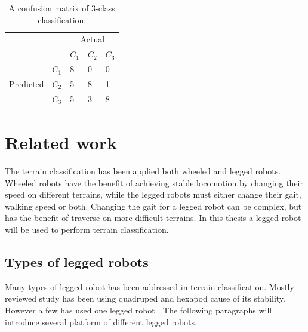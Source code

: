 \documentclass[USenglish]{ifimaster}  %
\begin{document}
	\begin{table}[h]
		\centering
		\begin{tabular}{ll|l|l|l|}
			\cline{3-5}
			&  & \multicolumn{3}{c|}{Actual} \\ \cline{3-5} 
			&  & $C_1$ & $C_2$ & $C_3$ \\ \hline
			\multicolumn{1}{|l|}{\multirow{3}{*}{Predicted}} & $C_1$ & 8 & 0 & 0 \\ \cline{2-5} 
			\multicolumn{1}{|l|}{} & $C_2$ & 5 & 8 & 1 \\ \cline{2-5} 
			\multicolumn{1}{|l|}{} & $C_3$ & 5 & 3 & 8 \\ \hline
		\end{tabular}
		\caption{A confusion matrix of 3-class classification.}
		\label{tab:cmatrix}
	\end{table}
	
	
	\section{Related work}
	The terrain classification has been applied both wheeled and legged robots. Wheeled robots have the benefit of achieving stable locomotion by changing their speed on different terrains, while the legged robots must either change their gait, walking speed or both. Changing the gait for a legged robot can be complex, but has the benefit of traverse on more difficult terrains. In this thesis a legged robot will be used to perform terrain classification.
	
	\subsection{Types of legged robots}
	Many types of legged robot has been addressed in terrain classification. Mostly reviewed study has been using quadruped \cite{6784609,littleDog,6849778,Hoffmann20141790} and hexapod \cite{Walas2015,26b23e912c654fe4b7478fd910130195,6569179} cause of its stability. However a few has used one legged robot \cite{5602459}. The following paragraphs will introduce several platform of different legged robots.
	
	
\end{document}
